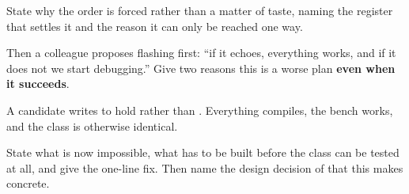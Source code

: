 State why the order is forced rather than a matter of taste, naming the register that settles it
and the reason it can only be reached one way.

Then a colleague proposes flashing  first: ``if it echoes, everything works, and
if it does not we start debugging.'' Give two reasons this is a worse plan \textbf{even when it
succeeds}. 

 A candidate writes  to hold  rather than
. Everything compiles, the bench works, and the class is
otherwise identical.

State what is now impossible, what has to be built before the class can be tested at all, and give
the one-line fix. Then name the design decision of  that this makes concrete. 
